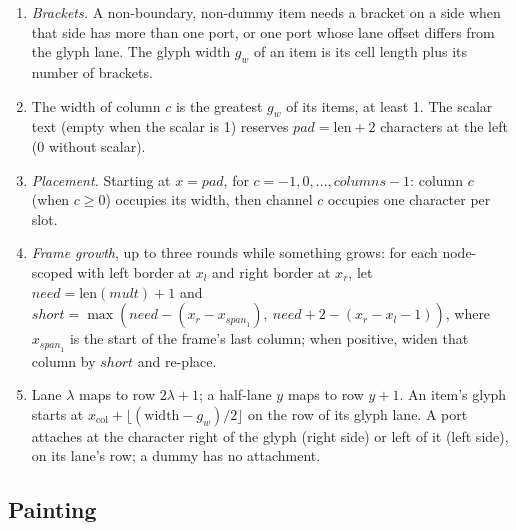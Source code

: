 {\begin{algorithm}\label{alg:pictorial-grid-geometry}
\begin{enumerate}
  \item \emph{Brackets.} A non-boundary, non-dummy item needs a bracket on a side when that side
    has more than one port, or one port whose lane offset differs from the glyph lane. The glyph
    width $g_w$ of an item is its cell length plus its number of brackets.
  \item The width of column $c$ is the greatest $g_w$ of its items, at least 1. The scalar text
    (empty when the scalar is 1) reserves $\mathit{pad} = \mathrm{len}+2$ characters at the left
    (0 without scalar).
  \item \emph{Placement.} Starting at $x=\mathit{pad}$, for $c = -1, 0, \dots,
    \mathit{columns}-1$: column $c$ (when $c\ge0$) occupies its width, then channel $c$ occupies
    one character per slot.
  \item \emph{Frame growth}, up to three rounds while something grows: for each node-scoped
    \bbox{} with left border at $x_l$ and right border at $x_r$, let
    $\mathit{need} = \mathrm{len}(\mathit{mult})+1$ and
    $\mathit{short} = \max(\mathit{need} - (x_r - x_{\mathit{span}_1}),\ \mathit{need}+2-(x_r -
    x_l - 1))$, where $x_{\mathit{span}_1}$ is the start of the frame's last column; when
    positive, widen that column by $\mathit{short}$ and re-place.
  \item Lane $\lambda$ maps to row $2\lambda+1$; a half-lane $y$ maps to row $y+1$. An item's
    glyph starts at $x_\text{col} + \lfloor(\text{width}-g_w)/2\rfloor$ on the row of its glyph
    lane. A port attaches at the character right of the glyph (right side) or left of it (left
    side), on its lane's row; a dummy has no attachment.
\end{enumerate}
\end{algorithm}

\subsection{Painting}\label{sec:pictorial-paint}

}
